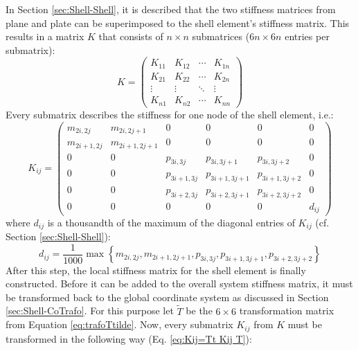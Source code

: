    In Section \ref{sec:Shell-Shell}, it is described that the two stiffness matrices from plane and plate can be superimposed to the shell element's stiffness matrix. This results in a matrix $K$ that consists of $n\!\times\! n$ submatrices ($6n\!\times\! 6n$ entries per submatrix):
   \begin{equation*}
   K = \begin{pmatrix}
   K_{11} & K_{12} & \cdots & K_{1n}\\
   K_{21} & K_{22} & \cdots & K_{2n}\\
   \vdots & \vdots & \ddots & \vdots\\
   K_{n1} & K_{n2} & \cdots & K_{nn}
   \end{pmatrix}
   \end{equation*}
   Every submatrix describes the stiffness for one node of the shell element, i.e.:
   \begin{equation*}
   K_{ij} = \begin{pmatrix}
   m_{2i,2j}   & m_{2i,2j+1}   & 0           & 0             & 0             & 0\\
   m_{2i+1,2j} & m_{2i+1,2j+1} & 0           & 0             & 0             & 0\\
   0           & 0             & p_{3i,3j}   & p_{3i,3j+1}   & p_{3i,3j+2}   & 0\\
   0           & 0             & p_{3i+1,3j} & p_{3i+1,3j+1} & p_{3i+1,3j+2} & 0\\
   0           & 0             & p_{3i+2,3j} & p_{3i+2,3j+1} & p_{3i+2,3j+2} & 0\\
   0           & 0             & 0           & 0             & 0             & d_{ij}
   \end{pmatrix}
   \end{equation*}
   where $d_{ij}$ is a thousandth of the maximum of the diagonal entries of $K_{ij}$ (cf. Section \ref{sec:Shell-Shell}):
   \begin{equation*}
   d_{ij} = \frac{1}{1000}\max \left\lbrace m_{2i,2j}, m_{2i+1,2j+1}, p_{3i,3j}, p_{3i+1,3j+1}, p_{3i+2,3j+2} \right\rbrace 
   \end{equation*}
   After this step, the local stiffness matrix for the shell element is finally constructed. Before it can be added to the overall system stiffness matrix, it must be transformed back to the global coordinate system as discussed in Section \ref{sec:Shell-CoTrafo}.
   For this purpose let $\tilde{T}$ be the $6\!\times\! 6$ transformation matrix from Equation \eqref{eq:trafoTtilde}. Now, every submatrix $K_{ij}$ from $K$ must be transformed in the following way (Eq. \eqref{eq:Kij=Tt Kij T}):
